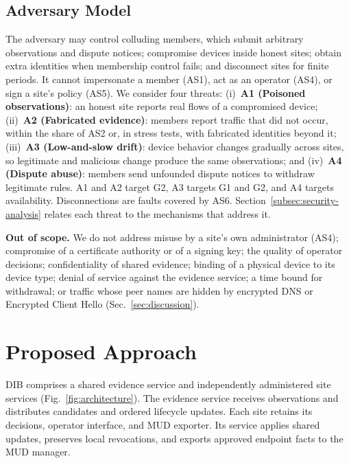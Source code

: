 \documentclass[journal]{IEEEtran}
\theoremstyle{definition}
\begin{document}
\subsection{Adversary Model}
\label{subsec:adversary}
The adversary may control colluding members, which submit arbitrary observations and dispute notices; compromise devices inside honest sites; obtain extra identities when membership control fails; and disconnect sites for finite periods. It cannot impersonate a member (AS1), act as an operator (AS4), or sign a site's policy (AS5). We consider four threats:
(i)~\textbf{A1 (Poisoned observations)}: an honest site reports real flows of a compromised device; (ii)~\textbf{A2 (Fabricated evidence)}: members report traffic that did not occur, within the share of AS2 or, in stress tests, with fabricated identities beyond it; (iii)~\textbf{A3 (Low-and-slow drift)}: device behavior changes gradually across sites, so legitimate and malicious change produce the same observations; and (iv)~\textbf{A4 (Dispute abuse)}: members send unfounded dispute notices to withdraw legitimate rules. A1 and A2 target G2, A3 targets G1 and G2, and A4 targets availability. Disconnections are faults covered by AS6. Section~\ref{subsec:security-analysis} relates each threat to the mechanisms that address it.

\textbf{Out of scope.} We do not address misuse by a site's own administrator (AS4); compromise of a certificate authority or of a signing key; the quality of operator decisions; confidentiality of shared evidence; binding of a physical device to its device type; denial of service against the evidence service; a time bound for withdrawal; or traffic whose peer names are hidden by encrypted DNS or Encrypted Client Hello (Sec.~\ref{sec:discussion}).

\section{Proposed Approach}
\label{sec:design}
DIB comprises a shared evidence service and independently administered site services (Fig.~\ref{fig:architecture}). The evidence service receives observations and distributes candidates and ordered lifecycle updates. Each site retains its decisions, operator interface, and MUD exporter. Its service applies shared updates, preserves local revocations, and exports approved endpoint facts to the MUD manager.
\end{document}
